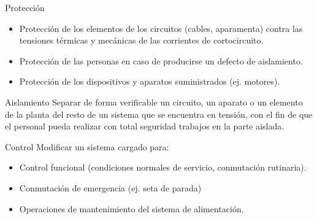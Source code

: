 \documentclass[xcolor={usenames,svgnames,dvipsnames}]{beamer}
\begin{document}
\begin{frame}[label={sec:orgbab5f79}]{Protección}
\begin{itemize}
\item Protección de los \alert{elementos de los circuitos} (cables,
aparamenta) contra las tensiones térmicas y mecánicas de las
corrientes de cortocircuito.

\item Protección de las \alert{personas} en caso de producirse un defecto de
aislamiento.

\item Protección de los \alert{dispositivos y aparatos suministrados} (ej. motores).
\end{itemize}
\end{frame}

\begin{frame}[label={sec:org8e70003}]{Aislamiento}
Separar de forma verificable un circuito, un aparato o un elemento de
la planta del resto de un sistema que se encuentra en tensión, con el
fin de que el personal pueda realizar con total seguridad trabajos en
la parte aislada.
\end{frame}

\begin{frame}[label={sec:orgf5a863d}]{Control}
Modificar un sistema cargado para:

\begin{itemize}
\item Control funcional (condiciones normales de servicio, conmutación rutinaria).

\item Conmutación de emergencia (ej. seta de parada)

\item Operaciones de mantenimiento del sistema de alimentación.
\end{itemize}
\end{frame}
\end{document}
